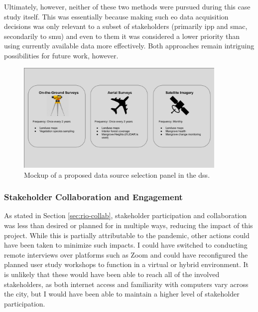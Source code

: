 Ultimately, however, neither of these two methods were pursued during this case study itself. This was essentially because making such \ac{eo} data acquisition decisions was only relevant to a subset of stakeholders (primarily \ac{ipp} and \ac{smac}, secondarily to \ac{smu}) and even to them it was considered a lower priority than using currently available data more effectively. Both approaches remain intriguing possibilities for future work, however.


\begin{figure}[!htb] 
\centering
\includegraphics[width=0.9\textwidth]{Figures/chap4/data_source_selection_panel.png}
\caption[Mockup of Rio DSS Data Source Selection]{Mockup of a proposed data source selection panel in the \ac{dss}.}
\label{fig:data_source_selection_panel}
\end{figure}
	
\subsubsection{Stakeholder Collaboration and Engagement} \label{sec:rio-discuss-stakeholder}

As stated in Section \ref{sec:rio-collab}, stakeholder participation and collaboration was less than desired or planned for in multiple ways, reducing the impact of this project. While this is partially attributable to the pandemic, other actions could have been taken to minimize such impacts. I could have switched to conducting remote interviews over platforms such as Zoom and could have reconfigured the planned user study workshops to function in a virtual or hybrid environment. It is unlikely that these would have been able to reach all of the involved stakeholders, as both internet access and familiarity with computers vary across the city, but I would have been able to maintain a higher level of stakeholder participation.

